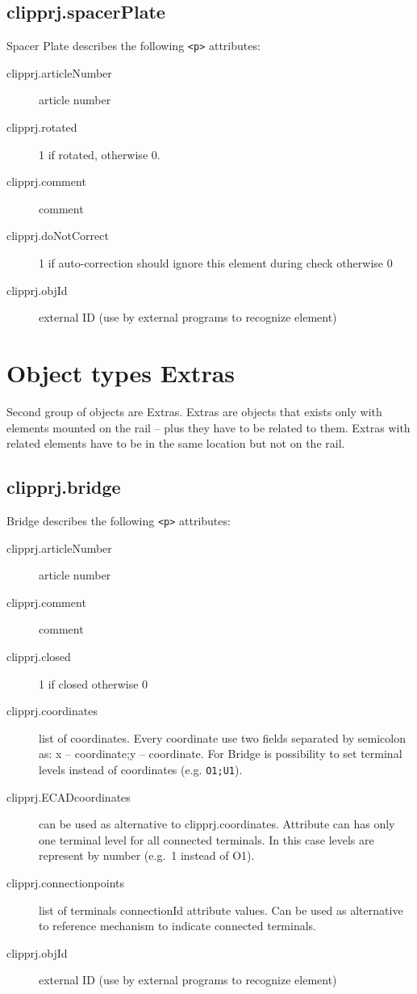 \documentclass[%
	a4paper,
	oneside,
	listof=numbered,
	parskip=half,
	headsepline=true,
	footsepline=false,
	normalheadings,
	0.7headlines,
	headexclude,
	]{scrbook}
\begin{document}
\subsection{clipprj.spacerPlate}
 
Spacer Plate describes the following \verb|<p>| attributes: 

\begin{description}
	\item[clipprj.articleNumber] article number 
	\item[clipprj.rotated] 1 if rotated, otherwise 0. 
	\item[clipprj.comment] comment 
	\item[clipprj.doNotCorrect] 1 if auto-correction should ignore this element during check otherwise 0 
	\item[clipprj.objId] external ID (use by external programs to recognize element) 
\end{description}

\section{Object types \glqq{}Extras\grqq{}} 
 
Second group of objects are Extras.
Extras are objects that exists only with elements mounted on the rail – plus they have to be related to them.
Extras with related elements have to be in the same location but not on the rail.

\subsection{clipprj.bridge}
 
Bridge describes the following \verb|<p>| attributes: 

\begin{description}
	\item[clipprj.articleNumber] article number 
	\item[clipprj.comment] comment 
	\item[clipprj.closed] 1 if closed otherwise 0 
	\item[clipprj.coordinates] list of coordinates.
	Every coordinate use two fields separated by semicolon as: x – coordinate;y – coordinate.
	For Bridge is possibility to set terminal levels instead of coordinates (e.g. \verb|O1;U1|).
	\item[clipprj.ECADcoordinates] can be used as alternative to clipprj.coordinates.
	Attribute can has only one terminal level for all connected terminals.
	In this case levels are represent by number (e.g.\ 1 instead of O1).
	\item[clipprj.connectionpoints] list of terminals connectionId attribute values.
	Can be used as alternative to reference mechanism to indicate connected terminals.
	\item[clipprj.objId] external ID (use by external programs to recognize element) 
\end{description}
\end{document}
